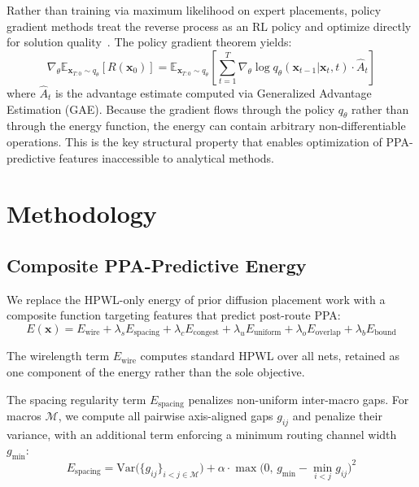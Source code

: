 \documentclass[sigconf,anonymous,review,9pt]{acmart}
\begin{document}
Rather than training via maximum likelihood on expert placements, policy
gradient methods treat the reverse process as an RL policy and optimize
directly for solution quality~\cite{sanokowski2025sdds, chen2026dac}.
The policy gradient theorem yields:
\begin{equation}
\label{eq:pg}
\nabla_\theta \mathbb{E}_{\mathbf{x}_{T:0} \sim q_\theta}[R(\mathbf{x}_0)]
= \mathbb{E}_{\mathbf{x}_{T:0} \sim q_\theta}\!\left[
\sum_{t=1}^{T} \nabla_\theta \log q_\theta(\mathbf{x}_{t-1} |
\mathbf{x}_t, t) \cdot \hat{A}_t \right]
\end{equation}
where $\hat{A}_t$ is the advantage estimate computed via Generalized
Advantage Estimation (GAE). Because the gradient flows through the
policy $q_\theta$ rather than through the energy function, the energy
can contain arbitrary non-differentiable operations. This is the key
structural property that enables optimization of PPA-predictive features
inaccessible to analytical methods.


\section{Methodology}
\label{sec:method}

\subsection{Composite PPA-Predictive Energy}

We replace the HPWL-only energy of prior diffusion placement work with a
composite function targeting features that predict post-route PPA:
\begin{equation}
\label{eq:energy}
E(\mathbf{x}) = E_{\text{wire}} + \lambda_s E_{\text{spacing}}
+ \lambda_c E_{\text{congest}} + \lambda_u E_{\text{uniform}}
+ \lambda_o E_{\text{overlap}} + \lambda_b E_{\text{bound}}
\end{equation}

The wirelength term $E_{\text{wire}}$ computes standard HPWL over all
nets, retained as one component of the energy rather than the sole
objective.

The spacing regularity term $E_{\text{spacing}}$ penalizes non-uniform
inter-macro gaps. For macros $\mathcal{M}$, we compute all pairwise
axis-aligned gaps $g_{ij}$ and penalize their variance, with an
additional term enforcing a minimum routing channel width $g_{\min}$:
\begin{equation}
\label{eq:spacing}
E_{\text{spacing}} = \text{Var}\!\big(\{g_{ij}\}_{i < j \in
\mathcal{M}}\big)
+ \alpha \cdot \max\!\big(0,\, g_{\min} -
\min_{i < j} g_{ij}\big)^2
\end{equation}
\end{document}
